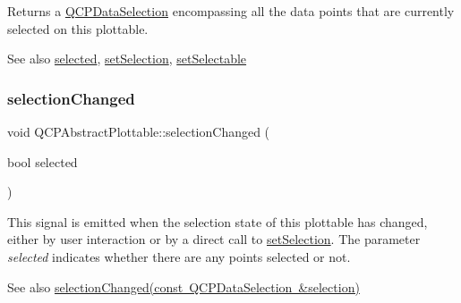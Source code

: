 Returns a \mbox{\hyperlink{class_q_c_p_data_selection}{Q\+C\+P\+Data\+Selection}} encompassing all the data points that are currently selected on this plottable.

\begin{DoxySeeAlso}{See also}
\mbox{\hyperlink{class_q_c_p_abstract_plottable_a0b3b514474fe93354fc74cfc144184b4}{selected}}, \mbox{\hyperlink{class_q_c_p_abstract_plottable_a219bc5403a9d85d3129165ec3f5ae436}{set\+Selection}}, \mbox{\hyperlink{class_q_c_p_abstract_plottable_ac238d6e910f976f1f30d41c2bca44ac3}{set\+Selectable}} 
\end{DoxySeeAlso}
\mbox{\label{class_q_c_p_abstract_plottable_a3af66432b1dca93b28e00e78a8c7c1d9}} 
\subsubsection{\texorpdfstring{selection\+Changed}{selectionChanged}\hspace{0.1cm}{\footnotesize\ttfamily [1/2]}}
{\footnotesize\ttfamily void Q\+C\+P\+Abstract\+Plottable\+::selection\+Changed (\begin{DoxyParamCaption}\item[{bool}]{selected }\end{DoxyParamCaption})\hspace{0.3cm}{\ttfamily [signal]}}

This signal is emitted when the selection state of this plottable has changed, either by user interaction or by a direct call to \mbox{\hyperlink{class_q_c_p_abstract_plottable_a219bc5403a9d85d3129165ec3f5ae436}{set\+Selection}}. The parameter {\itshape selected} indicates whether there are any points selected or not.

\begin{DoxySeeAlso}{See also}
\mbox{\hyperlink{class_q_c_p_abstract_plottable_a787a9c39421059006891744b731fa473}{selection\+Changed(const Q\+C\+P\+Data\+Selection \&selection)}} 
\end{DoxySeeAlso}
\mbox{\label{class_q_c_p_abstract_plottable_a787a9c39421059006891744b731fa473}} 
